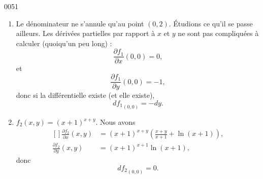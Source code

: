 
\begin{corrige}{0051}

\begin{enumerate}

\item 
Le dénominateur ne s'annule qu'au point $(0,2)$. Étudions ce qu'il se passe ailleurs. Les dérivées partielles par rapport à $x$ et $y$ ne sont pas compliquées à calculer (quoiqu'un peu long) :
\begin{equation}
	\frac{ \partial f_1 }{ \partial x }(0,0)=0,
\end{equation}
et
\begin{equation}
	\frac{ \partial f_1 }{ \partial y }(0,0)=-1,
\end{equation}
donc si la différentielle existe (et elle existe),
\begin{equation}
	d{f_1}_{(0,0)}=-dy.
\end{equation}

\item
$f_2(x,y)=(x+1)^{x+y}$.
Nous avons 
\begin{equation}
	\begin{aligned}[]
		\frac{ \partial f_2 }{ \partial x }(x,y)	&=(x+1)^{x+y}\left( \frac{ x+y }{ x+1 }+\ln(x+1) \right),\\
		\frac{ \partial f_2 }{ \partial y }(x,y)	&=(x+1)^{x+1}\ln(x+1),
	\end{aligned}
\end{equation}
donc
\begin{equation}
	d{f_2}_{(0,0)}=0.
\end{equation}

\end{enumerate}


\end{corrige}
